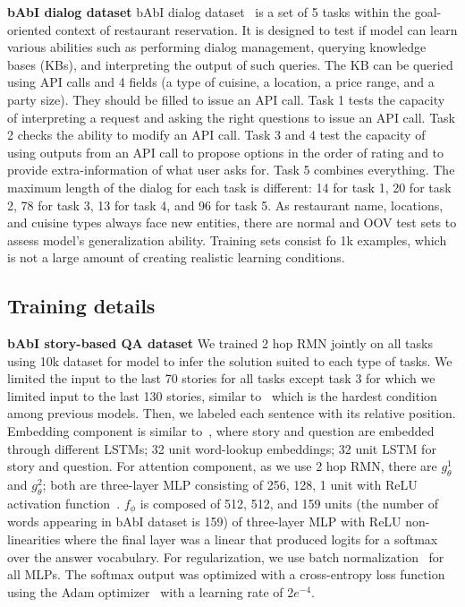 \documentclass{article} \usepackage{iclr2018_conference,times}
\begin{document}
\textbf{bAbI dialog dataset} \quad 
bAbI dialog dataset~\citep{Bordes16} is a set of 5 tasks within the goal-oriented context of restaurant reservation. 
It is designed to test if model can learn various abilities such as performing dialog management, querying knowledge bases (KBs), and interpreting the output of such queries. 
The KB can be queried using API calls and 4 fields (a type of cuisine, a location, a price range, and a party size).
They should be filled to issue an API call.
Task 1 tests the capacity of interpreting a request and asking the right questions to issue an API call.
Task 2 checks the ability to modify an API call.
Task 3 and 4 test the capacity of using outputs from an API call to propose options in the order of rating and to provide extra-information of what user asks for.
Task 5 combines everything. 
The maximum length of the dialog for each task is different: 14 for task 1, 20 for task 2, 78 for task 3, 13 for task 4, and 96 for task 5.
As restaurant name, locations, and cuisine types always face new entities, there are normal and OOV test sets to assess model's generalization ability. 
Training sets consist fo 1k examples, which is not a large amount of creating realistic learning conditions.




\subsection{Training details}

\textbf{bAbI story-based QA dataset} \quad 
We trained 2 hop RMN jointly on all tasks using 10k dataset for model to infer the solution suited to each type of tasks.  
We limited the input to the last 70 stories for all tasks except task 3 for which we limited input to the last 130 stories, similar to~\citet{xiong2016dynamic} which is the hardest condition among previous models.
Then, we labeled each sentence with its relative position. 
Embedding component is similar to~\citet{santoro2017simple}, where story and question are embedded through different LSTMs; 32 unit word-lookup embeddings; 32 unit LSTM for story and question.
For attention component, as we use 2 hop RMN, there are $g_\theta^1$ and $g_\theta^2$; both are three-layer MLP consisting of 256, 128, 1 unit with ReLU activation function~\citep{nair2010rectified}.
$f_\phi$ is composed of 512, 512, and 159 units (the number of words appearing in bAbI dataset is 159) of three-layer MLP with ReLU non-linearities where the final layer was a linear that produced logits for a softmax over the answer vocabulary. 
For regularization, we use batch normalization~\citep{ioffe2015batch} for all MLPs. 
The softmax output was optimized with a cross-entropy loss function using the Adam optimizer~\citep{kingma2014adam} with a learning rate of 2$e^{-4}$.
\end{document}
